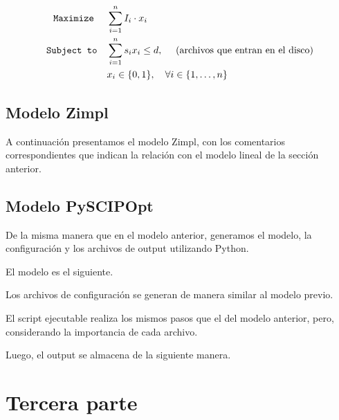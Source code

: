 \documentclass[11pt, a4paper, pdftex]{article}
\begin{document}
\begin{alignat*}{2}
	\texttt{Maximize}\quad\,\,
	& \sum_{i = 1}^{n} I_{i} \cdot x_{i}\\
	\texttt{Subject to}\quad
	& \sum_{i = 1}^{n} s_{i} x_{i} \le d,\ \quad\text{(archivos que entran en el disco)}\\
	& x_{i} \in \{0,1\}, \quad \forall i \in \{1, \ldots, n\}
\end{alignat*}

\newpage
\subsection{Modelo Zimpl}

A continuación presentamos el modelo Zimpl, con los comentarios correspondientes que indican la relación con el modelo lineal de la sección anterior.



\newpage
\subsection{Modelo PySCIPOpt}

De la misma manera que en el modelo anterior, generamos el modelo, la configuración y los 
archivos de output utilizando Python.

El modelo es el siguiente.



\newpage

Los archivos de configuración se generan de manera similar al modelo previo.



\newpage

El script ejecutable realiza los mismos pasos que el del modelo anterior, pero, considerando 
la importancia de cada archivo.



\newpage

Luego, el output se almacena de la siguiente manera.



\section{Tercera parte}
\end{document}
